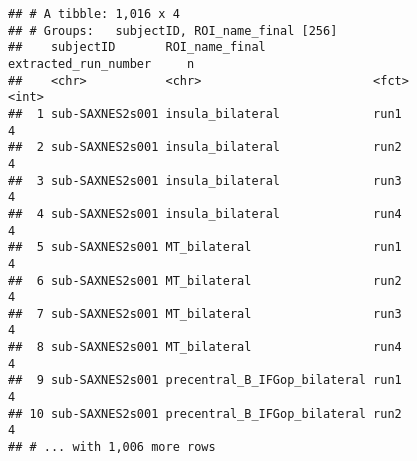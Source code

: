\documentclass[
]{article}
\newenvironment{Shaded}{\begin{snugshade}}{\end{snugshade}}
\newcommand{\AttributeTok}[1]{\textcolor[rgb]{0.77,0.63,0.00}{#1}}
\newcommand{\DecValTok}[1]{\textcolor[rgb]{0.00,0.00,0.81}{#1}}
\newcommand{\FunctionTok}[1]{\textcolor[rgb]{0.00,0.00,0.00}{#1}}
\newcommand{\NormalTok}[1]{#1}
\newcommand{\OtherTok}[1]{\textcolor[rgb]{0.56,0.35,0.01}{#1}}
\newcommand{\SpecialCharTok}[1]{\textcolor[rgb]{0.00,0.00,0.00}{#1}}
\newcommand{\StringTok}[1]{\textcolor[rgb]{0.31,0.60,0.02}{#1}}
\begin{document}
\begin{verbatim}
## # A tibble: 1,016 x 4
## # Groups:   subjectID, ROI_name_final [256]
##    subjectID       ROI_name_final               extracted_run_number     n
##    <chr>           <chr>                        <fct>                <int>
##  1 sub-SAXNES2s001 insula_bilateral             run1                     4
##  2 sub-SAXNES2s001 insula_bilateral             run2                     4
##  3 sub-SAXNES2s001 insula_bilateral             run3                     4
##  4 sub-SAXNES2s001 insula_bilateral             run4                     4
##  5 sub-SAXNES2s001 MT_bilateral                 run1                     4
##  6 sub-SAXNES2s001 MT_bilateral                 run2                     4
##  7 sub-SAXNES2s001 MT_bilateral                 run3                     4
##  8 sub-SAXNES2s001 MT_bilateral                 run4                     4
##  9 sub-SAXNES2s001 precentral_B_IFGop_bilateral run1                     4
## 10 sub-SAXNES2s001 precentral_B_IFGop_bilateral run2                     4
## # ... with 1,006 more rows
\end{verbatim}

\begin{Shaded}
\end{Shaded}
\end{document}
